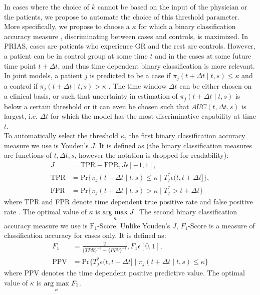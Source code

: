 In cases where the choice of $k$ cannot be based on the input of the physician or the patients, we propose to automate the choice of this threshold parameter. More specifically, we propose to choose a $\kappa$ for which a binary classification accuracy measure \citep{lopez2014optimalcutpoints,sokolova2009systematic}, discriminating between cases and controls, is maximized. In PRIAS, cases are patients who experience GR and the rest are controls. However, a patient can be in control group at some time $t$ and in the cases at some future time point $t + \Delta t$, and thus time dependent binary classification is more relevant. In joint models, a patient $j$ is predicted to be a case if $\pi_j(t + \Delta t \mid t,s) \leq \kappa$ and a control if $\pi_j(t + \Delta t \mid t,s) > \kappa$ \citep{rizopoulosJMbayes}. The time window $\Delta t$ can be either chosen on a clinical basis, or such that uncertainty in estimation of $\pi_j(t + \Delta t \mid t,s)$ is below a certain threshold or it can even be chosen such that $AUC(t, \Delta t, s)$ \citep{rizopoulosJMbayes} is largest, i.e. $\Delta t$ for which the model has the most discriminative capability at time $t$.\\

To automatically select the threshold $\kappa$, the first binary classification accuracy measure we use is Youden's $J$. It is defined as (the binary classification measures are functions of $t, \Delta t, s$, however the notation is
dropped for readability):
\begin{align*}
J &= \text{TPR} - \text{FPR}, J\epsilon [-1,1],\\
\text{TPR} &= \mbox{Pr}\big\{\pi_j(t + \Delta t \mid t,s) \leq \kappa \mid T^*_j \epsilon (t, t + \Delta t]\big\},\\
\text{FPR} &= \mbox{Pr}\big\{\pi_j(t + \Delta t \mid t,s) > \kappa \mid T^*_j > t + \Delta t \big\}
\end{align*}
where TPR and FPR denote time dependent true positive rate and false positive rate \citep{rizopoulosJMbayes}. The optimal value of $\kappa$ is $\underset{\kappa}{\operatorname{arg}\,\operatorname{max}}\; J$. The second binary classification accuracy measure we use is $\text{F}_1$-Score. Unlike Youden's $J$, $F_1$-Score is a measure of classification accuracy for cases only. It is defined as:
\begin{align*}
F_1 &= \frac{2}{\{TPR\}^{-1} + \{PPV\}^{-1}}, F_1 \epsilon [0,1],\\
\text{PPV} &= \mbox{Pr}\big\{T^*_j \epsilon (t, t + \Delta t] \mid \pi_j(t + \Delta t \mid t,s) \leq \kappa \big\}
\end{align*}
where PPV denotes the time dependent positive predictive value. The optimal value of $\kappa$ is $\underset{\kappa}{\operatorname{arg}\,\operatorname{max}}\; F_1$.

